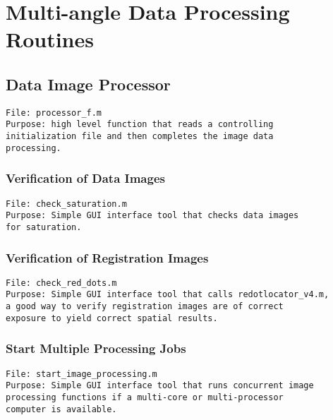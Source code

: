 


\pagebreak
\section{Multi-angle Data Processing Routines}
\label{data_procesing_routines}

\subsection{Data Image Processor}
\begin{verbatim} 
File: processor_f.m
Purpose: high level function that reads a controlling 
initialization file and then completes the image data 
processing.
\end{verbatim}



\pagebreak
\subsubsection{Verification of Data Images}
\begin{verbatim} 
File: check_saturation.m
Purpose: Simple GUI interface tool that checks data images 
for saturation.
\end{verbatim}



\pagebreak
\subsubsection{Verification of Registration Images}
\begin{verbatim} 
File: check_red_dots.m
Purpose: Simple GUI interface tool that calls redotlocator_v4.m,
a good way to verify registration images are of correct 
exposure to yield correct spatial results.
\end{verbatim}



\pagebreak
\subsubsection{Start Multiple Processing Jobs}
\begin{verbatim} 
File: start_image_processing.m
Purpose: Simple GUI interface tool that runs concurrent image 
processing functions if a multi-core or multi-processor 
computer is available.
\end{verbatim}

